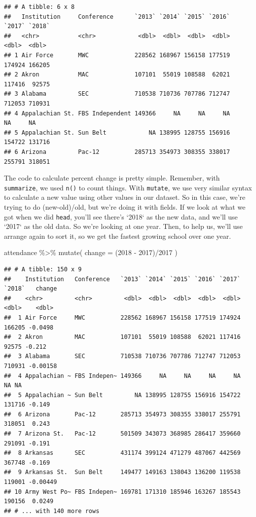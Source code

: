 \documentclass[
]{book}
\newenvironment{Shaded}{\begin{snugshade}}{\end{snugshade}}
\newcommand{\AttributeTok}[1]{\textcolor[rgb]{0.77,0.63,0.00}{#1}}
\newcommand{\FunctionTok}[1]{\textcolor[rgb]{0.00,0.00,0.00}{#1}}
\newcommand{\NormalTok}[1]{#1}
\newcommand{\SpecialCharTok}[1]{\textcolor[rgb]{0.00,0.00,0.00}{#1}}
\newcommand{\StringTok}[1]{\textcolor[rgb]{0.31,0.60,0.02}{#1}}
\begin{document}
\begin{verbatim}
## # A tibble: 6 x 8
##   Institution     Conference      `2013` `2014` `2015` `2016` `2017` `2018`
##   <chr>           <chr>            <dbl>  <dbl>  <dbl>  <dbl>  <dbl>  <dbl>
## 1 Air Force       MWC             228562 168967 156158 177519 174924 166205
## 2 Akron           MAC             107101  55019 108588  62021 117416  92575
## 3 Alabama         SEC             710538 710736 707786 712747 712053 710931
## 4 Appalachian St. FBS Independent 149366     NA     NA     NA     NA     NA
## 5 Appalachian St. Sun Belt            NA 138995 128755 156916 154722 131716
## 6 Arizona         Pac-12          285713 354973 308355 338017 255791 318051
\end{verbatim}

The code to calculate percent change is pretty simple. Remember, with \texttt{summarize}, we used \texttt{n()} to count things. With \texttt{mutate}, we use very similar syntax to calculate a new value using other values in our dataset. So in this case, we're trying to do (new-old)/old, but we're doing it with fields. If we look at what we got when we did \texttt{head}, you'll see there's `2018` as the new data, and we'll use `2017` as the old data. So we're looking at one year. Then, to help us, we'll use arrange again to sort it, so we get the fastest growing school over one year.

\begin{Shaded}
\begin{Highlighting}[]
\NormalTok{attendance }\SpecialCharTok{\%\textgreater{}\%} \FunctionTok{mutate}\NormalTok{(}
  \AttributeTok{change =}\NormalTok{ (}\StringTok{\textasciigrave{}}\AttributeTok{2018}\StringTok{\textasciigrave{}} \SpecialCharTok{{-}} \StringTok{\textasciigrave{}}\AttributeTok{2017}\StringTok{\textasciigrave{}}\NormalTok{)}\SpecialCharTok{/}\StringTok{\textasciigrave{}}\AttributeTok{2017}\StringTok{\textasciigrave{}}
\NormalTok{) }
\end{Highlighting}
\end{Shaded}

\begin{verbatim}
## # A tibble: 150 x 9
##    Institution   Conference   `2013` `2014` `2015` `2016` `2017` `2018`   change
##    <chr>         <chr>         <dbl>  <dbl>  <dbl>  <dbl>  <dbl>  <dbl>    <dbl>
##  1 Air Force     MWC          228562 168967 156158 177519 174924 166205 -0.0498 
##  2 Akron         MAC          107101  55019 108588  62021 117416  92575 -0.212  
##  3 Alabama       SEC          710538 710736 707786 712747 712053 710931 -0.00158
##  4 Appalachian ~ FBS Indepen~ 149366     NA     NA     NA     NA     NA NA      
##  5 Appalachian ~ Sun Belt         NA 138995 128755 156916 154722 131716 -0.149  
##  6 Arizona       Pac-12       285713 354973 308355 338017 255791 318051  0.243  
##  7 Arizona St.   Pac-12       501509 343073 368985 286417 359660 291091 -0.191  
##  8 Arkansas      SEC          431174 399124 471279 487067 442569 367748 -0.169  
##  9 Arkansas St.  Sun Belt     149477 149163 138043 136200 119538 119001 -0.00449
## 10 Army West Po~ FBS Indepen~ 169781 171310 185946 163267 185543 190156  0.0249 
## # ... with 140 more rows
\end{verbatim}
\end{document}
